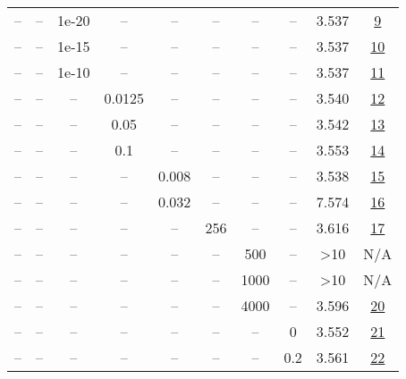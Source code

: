 \begin{table}[H]
\begin{tabular}{cccccccccc}
-- & -- & 1e-20 & -- & -- & -- & -- & -- & 3.537 & \href{https://wandb.ai/stanford-mercury/optimizer-scaling/runs/sweep-130m-2B-mars7253f2lr0.016-wd0.1-minlr0-warmup2000-b10.9-b2-9c8165}{9} \\
-- & -- & 1e-15 & -- & -- & -- & -- & -- & 3.537 & \href{https://wandb.ai/stanford-mercury/optimizer-scaling/runs/sweep-130m-2B-mars43bbc9lr0.016-wd0.1-minlr0-warmup2000-b10.9-b2-805b23}{10} \\
-- & -- & 1e-10 & -- & -- & -- & -- & -- & 3.537 & \href{https://wandb.ai/stanford-mercury/optimizer-scaling/runs/sweep-130m-2B-mars2566cflr0.016-wd0.1-minlr0-warmup2000-b10.9-b2-b6fd06}{11} \\
-- & -- & -- & 0.0125 & -- & -- & -- & -- & 3.540 & \href{https://wandb.ai/stanford-mercury/optimizer-scaling/runs/sweep-130m-2B-mars176e13lr0.016-wd0.1-minlr0-warmup2000-b10.9-b2-2cfa05}{12} \\
-- & -- & -- & 0.05 & -- & -- & -- & -- & 3.542 & \href{https://wandb.ai/stanford-mercury/optimizer-scaling/runs/sweep-130m-2B-mars3356c4lr0.016-wd0.1-minlr0-warmup2000-b10.9-b2-e25891}{13} \\
-- & -- & -- & 0.1 & -- & -- & -- & -- & 3.553 & \href{https://wandb.ai/stanford-mercury/optimizer-scaling/runs/sweep-130m-2B-mars29f7d4lr0.016-wd0.1-minlr0-warmup2000-b10.9-b2-723099}{14} \\
-- & -- & -- & -- & 0.008 & -- & -- & -- & 3.538 & \href{https://wandb.ai/stanford-mercury/optimizer-scaling/runs/sweep-130m-2B-mars33a7c2lr0.008-wd0.1-minlr0-warmup2000-b10.9-b2-485319}{15} \\
-- & -- & -- & -- & 0.032 & -- & -- & -- & 7.574 & \href{https://wandb.ai/stanford-mercury/optimizer-scaling/runs/sweep-130m-2B-mars8c1591lr0.032-wd0.1-minlr0-warmup2000-b10.9-b2-8906e2}{16} \\
-- & -- & -- & -- & -- & 256 & -- & -- & 3.616 & \href{https://wandb.ai/stanford-mercury/optimizer-scaling/runs/sweep-130m-2B-marsaf638flr0.016-wd0.1-minlr0-warmup2000-b10.9-b2-184b59}{17} \\
-- & -- & -- & -- & -- & -- & 500 & -- & >10 & N/A \\
-- & -- & -- & -- & -- & -- & 1000 & -- & >10 & N/A \\
-- & -- & -- & -- & -- & -- & 4000 & -- & 3.596 & \href{https://wandb.ai/stanford-mercury/optimizer-scaling/runs/sweep-130m-2B-mars15198alr0.016-wd0.1-minlr0-warmup4000-b10.9-b2-b45af5}{20} \\
-- & -- & -- & -- & -- & -- & -- & 0 & 3.552 & \href{https://wandb.ai/stanford-mercury/optimizer-scaling/runs/sweep-130m-2B-mars05131flr0.016-wd0-minlr0-warmup2000-b10.9-b20.-26f8c3}{21} \\
-- & -- & -- & -- & -- & -- & -- & 0.2 & 3.561 & \href{https://wandb.ai/stanford-mercury/optimizer-scaling/runs/sweep-130m-2B-mars17082alr0.016-wd0.2-minlr0-warmup2000-b10.9-b2-0dc23c}{22} \\
\bottomrule
\end{tabular}
\end{table}

